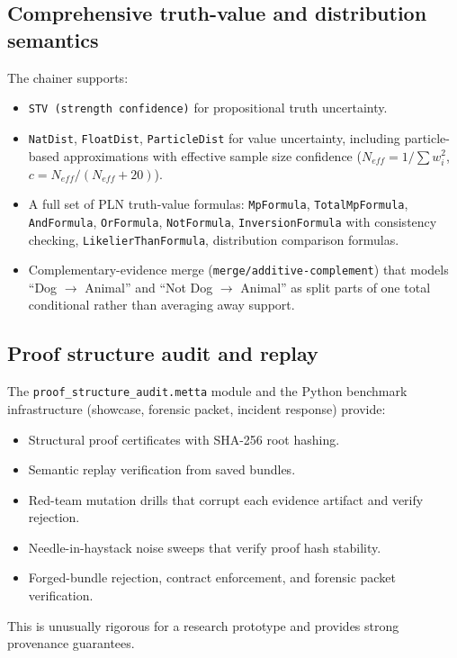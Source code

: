 \documentclass[11pt]{article}
\begin{document}
\subsection{Comprehensive truth-value and distribution semantics}

The chainer supports:
\begin{itemize}[nosep]
  \item \texttt{STV (strength confidence)} for propositional truth uncertainty.
  \item \texttt{NatDist}, \texttt{FloatDist}, \texttt{ParticleDist} for value
  uncertainty, including particle-based approximations with effective sample size
  confidence ($N_{eff} = 1/\sum w_i^2$, $c = N_{eff}/(N_{eff}+20)$).
  \item A full set of PLN truth-value formulas: \texttt{MpFormula},
  \texttt{TotalMpFormula}, \texttt{AndFormula}, \texttt{OrFormula},
  \texttt{NotFormula}, \texttt{InversionFormula} with consistency checking,
  \texttt{LikelierThanFormula}, distribution comparison formulas.
  \item Complementary-evidence merge (\texttt{merge/additive-complement}) that
  models ``Dog $\to$ Animal'' and ``Not Dog $\to$ Animal'' as split parts of one
  total conditional rather than averaging away support.
\end{itemize}

\subsection{Proof structure audit and replay}

The \texttt{proof\_structure\_audit.metta} module and the Python benchmark
infrastructure (showcase, forensic packet, incident response) provide:
\begin{itemize}[nosep]
  \item Structural proof certificates with SHA-256 root hashing.
  \item Semantic replay verification from saved bundles.
  \item Red-team mutation drills that corrupt each evidence artifact and verify
  rejection.
  \item Needle-in-haystack noise sweeps that verify proof hash stability.
  \item Forged-bundle rejection, contract enforcement, and forensic packet
  verification.
\end{itemize}
This is unusually rigorous for a research prototype and provides strong
provenance guarantees.
\end{document}
